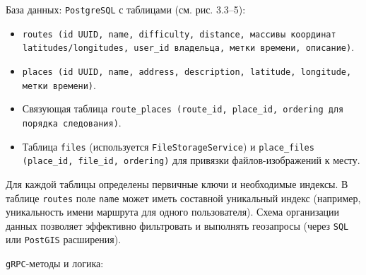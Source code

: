 База данных: \texttt{PostgreSQL} с таблицами (см. рис. 3.3–5):
\begin{itemize}
    \item \texttt{routes (id UUID, name, difficulty, distance, массивы координат \\ latitudes/longitudes, user\_id владельца, метки времени, описание)}.
    \item \texttt{places (id UUID, name, address, description, latitude, longitude, метки времени)}.
    \item Связующая таблица \texttt{route\_places (route\_id, place\_id, ordering для порядка следования)}.
    \item Таблица \texttt{files} (используется \texttt{FileStorageService}) и \texttt{place\_files (place\_id, file\_id, ordering)} для привязки файлов-изображений к месту.
\end{itemize}
\noindent Для каждой таблицы определены первичные ключи и необходимые индексы. В таблице \texttt{routes} поле \texttt{name} может иметь составной уникальный индекс (например, уникальность имени маршрута для одного пользователя). Схема организации данных позволяет эффективно фильтровать и выполнять геозапросы (через \texttt{SQL} или \texttt{PostGIS} расширения).

\texttt{gRPC}-методы и логика:


